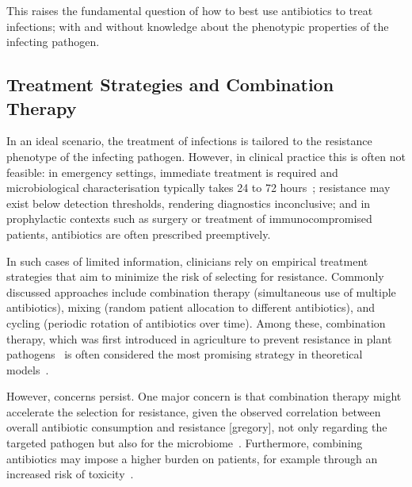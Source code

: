 \documentclass[../main.tex]{subfiles}
\begin{document}
This raises the fundamental question of how to best use antibiotics to treat infections; with and without knowledge about the phenotypic properties of the infecting pathogen.

\subsection{Treatment Strategies and Combination Therapy}
In an ideal scenario, the treatment of infections is tailored to the resistance phenotype of the infecting pathogen.
However, in clinical practice this is often not feasible: in emergency settings, immediate treatment is required and microbiological characterisation typically takes 24 to 72 hours~\cite{Leekha2011}; resistance may exist below detection thresholds, rendering diagnostics inconclusive; and in prophylactic contexts such as surgery or treatment of immunocompromised patients, antibiotics are often prescribed preemptively.

In such cases of limited information, clinicians rely on empirical treatment strategies that aim to minimize the risk of selecting for resistance.
Commonly discussed approaches include combination therapy (simultaneous use of multiple antibiotics), mixing (random patient allocation to different antibiotics), and cycling (periodic rotation of antibiotics over time).
Among these, combination therapy, which was first introduced in agriculture to prevent resistance in plant pathogens~\cite{Kable1980, Delp1980, Skylakakis1981} is often considered the most promising strategy in theoretical models~\cite{Bonhoeffer1997, Tepekule2017,Uecker2021}.

However, concerns persist.
One major concern is that combination therapy might accelerate the selection for resistance, given the observed correlation between overall antibiotic consumption and resistance [gregory], not only regarding the targeted pathogen but also for the microbiome~\cite{...}.
Furthermore, combining antibiotics may impose a higher burden on patients, for example through an increased risk of toxicity~\cite{Tamma2012}.
\end{document}
